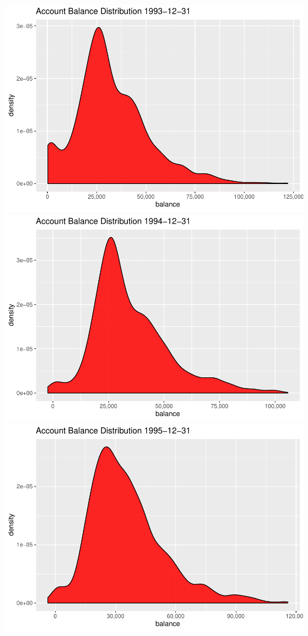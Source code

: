 \documentclass[]{article}
\begin{document}
\includegraphics{analysis_gehrig_files/figure-latex/unnamed-chunk-10-1.pdf}
\includegraphics{analysis_gehrig_files/figure-latex/unnamed-chunk-10-2.pdf}
\includegraphics{analysis_gehrig_files/figure-latex/unnamed-chunk-10-3.pdf}
\end{document}
